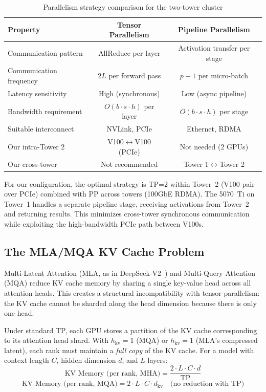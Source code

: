 \documentclass[11pt,letterpaper]{article}
\theoremstyle{definition}
\begin{document}
\begin{table}[htbp]
\centering
\caption{Parallelism strategy comparison for the two-tower cluster}
\label{tab:parallelism-comparison}
\begin{tabular}{@{}lcc@{}}
\toprule
\textbf{Property} & \textbf{Tensor Parallelism} & \textbf{Pipeline Parallelism} \\
\midrule
Communication pattern & AllReduce per layer & Activation transfer per stage \\
Communication frequency & $2L$ per forward pass & $p-1$ per micro-batch \\
Latency sensitivity & High (synchronous) & Low (async pipeline) \\
Bandwidth requirement & $O(b \cdot s \cdot h)$ per layer & $O(b \cdot s \cdot h)$ per stage \\
Suitable interconnect & NVLink, PCIe & Ethernet, RDMA \\
Our intra-Tower 2 & V100$\leftrightarrow$V100 (PCIe) & Not needed (2 GPUs) \\
Our cross-tower & Not recommended & Tower 1$\leftrightarrow$Tower 2 \\
\bottomrule
\end{tabular}
\end{table}

For our configuration, the optimal strategy is TP=2 within Tower~2 (V100 pair over PCIe) combined with PP across towers (100GbE RDMA). The 5070~Ti on Tower~1 handles a separate pipeline stage, receiving activations from Tower~2 and returning results. This minimizes cross-tower synchronous communication while exploiting the high-bandwidth PCIe path between V100s.

\subsection{The MLA/MQA KV Cache Problem}
\label{sec:mla-problem}

Multi-Latent Attention (MLA, as in DeepSeek-V2~\cite{deepseekv2}) and Multi-Query Attention (MQA) reduce KV cache memory by sharing a single key-value head across all attention heads. This creates a structural incompatibility with tensor parallelism: the KV cache cannot be sharded along the head dimension because there is only one head.

Under standard TP, each GPU stores a partition of the KV cache corresponding to its attention head shard. With $h_{\text{kv}} = 1$ (MQA) or $h_{\text{kv}} = 1$ (MLA's compressed latent), each rank must maintain a \emph{full copy} of the KV cache. For a model with context length $C$, hidden dimension $d$, and $L$ layers:
\begin{equation}
    \text{KV Memory (per rank, MHA)} = \frac{2 \cdot L \cdot C \cdot d}{\text{TP}}
\end{equation}
\begin{equation}
    \text{KV Memory (per rank, MQA)} = 2 \cdot L \cdot C \cdot d_{\text{kv}} \quad \text{(no reduction with TP)}
\end{equation}
\end{document}
